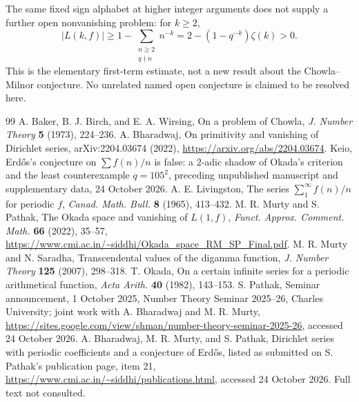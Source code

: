\documentclass[11pt]{amsart}
\theoremstyle{definition}
\theoremstyle{remark}
\numberwithin{equation}{section}
\begin{document}
The same fixed sign alphabet at higher integer arguments does not supply
a further open nonvanishing problem: for $k\ge2$,
\[
 |L(k,f)|\ge 1-\sum_{\substack{n\ge2\\q\nmid n}}n^{-k}
 =2-(1-q^{-k})\zeta(k)>0.
\]
This is the elementary first-term estimate, not a new result about the
Chowla--Milnor conjecture. No unrelated named open conjecture is claimed
to be resolved here.

\begin{thebibliography}{99}
 A. Baker, B. J. Birch, and E. A. Wirsing,
On a problem of Chowla, \emph{J. Number Theory} \textbf{5} (1973), 224--236.
 A. Bharadwaj,
On primitivity and vanishing of Dirichlet series,
arXiv:2204.03674 (2022), \url{https://arxiv.org/abs/2204.03674}.
 Keio,
Erd\H{o}s's conjecture on $\sum f(n)/n$ is false:
a $2$-adic shadow of Okada's criterion and the least counterexample
$q=105^2$, preceding unpublished manuscript and supplementary data,
24 October 2026.
 A. E. Livingston,
The series $\sum_1^\infty f(n)/n$ for periodic $f$,
\emph{Canad. Math. Bull.} \textbf{8} (1965), 413--432.
 M. R. Murty and S. Pathak,
The Okada space and vanishing of $L(1,f)$,
\emph{Funct. Approx. Comment. Math.} \textbf{66} (2022), 35--57,
\url{https://www.cmi.ac.in/~siddhi/Okada_space_RM_SP_Final.pdf}.
 M. R. Murty and N. Saradha,
Transcendental values of the digamma function,
\emph{J. Number Theory} \textbf{125} (2007), 298--318.
 T. Okada,
On a certain infinite series for a periodic arithmetical function,
\emph{Acta Arith.} \textbf{40} (1982), 143--153.
 S. Pathak,
Seminar announcement, 1 October 2025,
Number Theory Seminar 2025--26, Charles University;
joint work with A. Bharadwaj and M. R. Murty,
\url{https://sites.google.com/view/shman/number-theory-seminar-2025-26},
accessed 24 October 2026.
 A. Bharadwaj, M. R. Murty, and S. Pathak,
Dirichlet series with periodic coefficients and a conjecture of Erd\H{o}s,
listed as submitted on S. Pathak's publication page, item 21,
\url{https://www.cmi.ac.in/~siddhi/publications.html},
accessed 24 October 2026. Full text not consulted.
\end{thebibliography}
\end{document}
